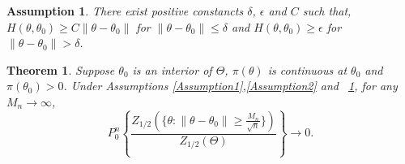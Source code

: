 \documentclass[3p]{elsarticle}
\theoremstyle{plain}
\newtheorem{theorem}{\quad\quad Theorem}
\newtheorem{assumption}{\quad\quad Assumption}
\theoremstyle{definition}
\theoremstyle{remark}
\begin{document}
\begin{assumption}\label{Assumption4}
    There exist positive constancts $\delta$, $\epsilon$ and $C$ such that,
     $H(\theta,\theta_0)  \geq  C \|\theta-\theta_0\|$ for $\|\theta-\theta_0\|\leq \delta$ and $H(\theta,\theta_0) \geq \epsilon$ for $\|\theta-\theta_0\|>\delta$.
\end{assumption}
\begin{theorem}
    Suppose $\theta_0$ is an interior of $\Theta$, $\pi(\theta)$ is continuous at $\theta_0$ and $\pi(\theta_0)>0$.
    Under Assumptions \ref{Assumption1},\ref{Assumption2} and ~\ref{Assumption4},  for any $M_n\to \infty$,
    $$
         P_0^n \left\{ \frac{Z_{1/2} ( \{\theta: \|\theta-\theta_0\|\geq \frac{M_n}{\sqrt{n}}\})}{Z_{1/2}(\Theta)}
         \right\}
    \to  0
    .
    $$
\end{theorem}
\end{document}
